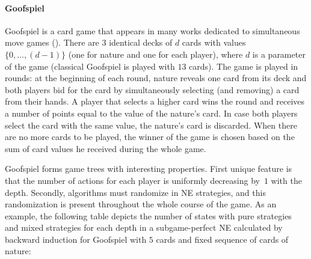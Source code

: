 \paragraph{\textbf{Goofspiel}}
Goofspiel is a card game that appears in many works dedicated to simultaneous move games (\eg \cite{Ross71Goofspiel,Rhoads12Computer,Saffidine12SMAB,Lanctot13Goofspiel}).
There are $3$ identical decks of $d$ cards with values $\{0,\dots, (d-1)\}$ (one for nature and one for each player), where $d$ is a parameter of the game (classical Goofspiel is played with $13$ cards).
The game is played in rounds: at the beginning of each round, nature reveals one card from its deck and both players bid for the card by simultaneously selecting (and removing) a card from their hands.
A player that selects a higher card wins the round and receives a number of points equal to the value of the nature's card.
In case both players select the card with the same value, the nature's card is discarded.
When there are no more cards to be played, the winner of the game is chosen based on the sum of card values he received during the whole game.


Goofspiel forms game trees with interesting properties.
First unique feature is that the number of actions for each player is uniformly decreasing by~$1$ with the depth.
Secondly, algorithms must randomize in NE strategies, and this randomization is present throughout the whole course of the game.
As an example, the following table depicts the number of states with pure strategies and mixed strategies for each depth in a subgame-perfect NE calculated by backward induction for Goofspiel with $5$ cards and fixed sequence of cards of nature:

